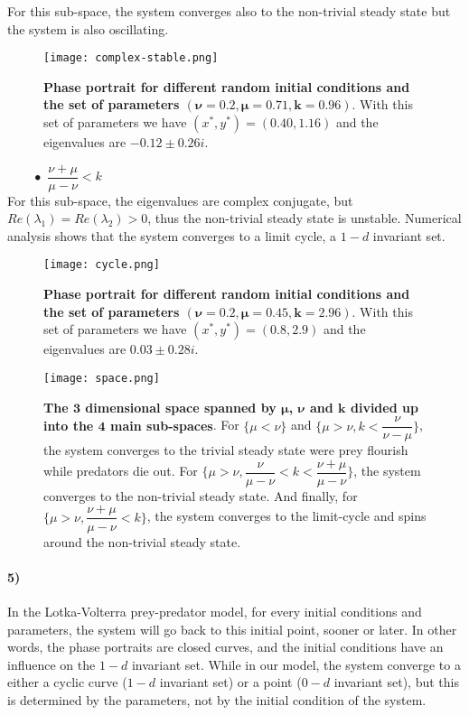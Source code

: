 \documentclass{article}
\begin{document}
For this sub-space, the system converges also to the non-trivial steady state but the system is also oscillating.

\begin{figure}[H]
	  \centering
  	\texttt{[image: complex-stable.png]}
  	  	\caption{\textbf{Phase portrait for different random initial conditions and the set of parameters $\pmb{(\nu=0.2,\mu=0.71,k=0.96)}$}. With this set of parameters we have $(x^*,y^*)=(0.40,1.16)$ and the eigenvalues are $-0.12 \pm 0.26i$.}
	\end{figure}
$\qquad \bullet$ $\dfrac{\nu+\mu}{\mu-\nu}<k$\\

For this sub-space, the eigenvalues are complex conjugate, but $Re(\lambda_1)=Re(\lambda_2)>0$, thus the non-trivial steady state is unstable. Numerical analysis shows that the system converges to a limit cycle, a $1-d$ invariant set.
\begin{figure}[H]
	  \centering
  	\texttt{[image: cycle.png]}
  	\caption{\textbf{Phase portrait for different random initial conditions and the set of parameters $\pmb{(\nu=0.2,\mu=0.45,k=2.96)}$}. With this set of parameters we have $(x^*,y^*)=(0.8,2.9)$ and the eigenvalues are $0.03 \pm 0.28i$.}
	\end{figure}

\begin{figure}[H]
	  \centering
  	\texttt{[image: space.png]}
  	\caption{\textbf{The $\pmb{3}$ dimensional space spanned by $\pmb{\mu}$, $\pmb{\nu}$ and $\pmb{k}$ divided up into the $\pmb{4}$ main sub-spaces}. For  $\{ \mu<\nu \}$ and $\{\mu>\nu,k<\dfrac{\nu}{\nu-\mu}\}$, the system converges to the trivial steady state were prey flourish while predators die out. For $\{\mu>\nu,\dfrac{\nu}{\mu-\nu}<k<\dfrac{\nu+\mu}{\mu-\nu}\}$, the system converges to the non-trivial steady state. And finally, for $\{\mu>\nu,\dfrac{\nu+\mu}{\mu-\nu}<k\}$, the system converges to the limit-cycle and spins around the non-trivial steady state.}
	\end{figure}


\paragraph{5)}
In the Lotka-Volterra prey-predator model, for every initial conditions and parameters, the system will go back to this initial point, sooner or later. In other words, the phase portraits are closed curves, and the initial conditions have an influence on the $1-d$ invariant set. While in our model, the system converge to a either a cyclic curve ($1-d$ invariant set) or a point ($0-d$ invariant set), but this is determined by the parameters, not by the initial condition of the system. 
\end{document}
